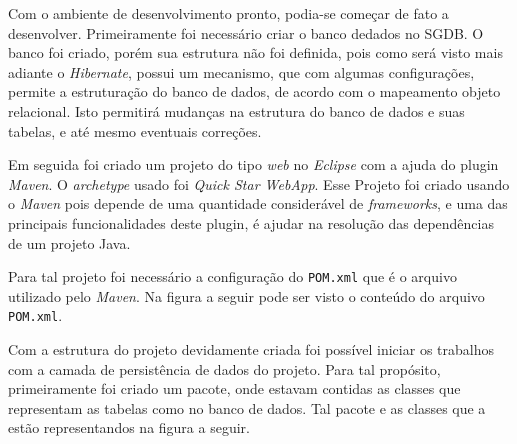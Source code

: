 
	\par Com o ambiente de desenvolvimento pronto, podia-se começar de fato a
desenvolver. Primeiramente foi necessário criar o banco dedados no SGDB. O
banco foi criado, porém sua estrutura não foi definida, pois como será
visto mais adiante o \textit{Hibernate}, possui um mecanismo, que com algumas
configurações, permite a estruturação do banco de dados, de acordo com o
mapeamento objeto relacional. Isto permitirá mudanças na estrutura do banco de
dados e suas tabelas, e até mesmo eventuais correções.

	\par Em seguida foi criado um projeto do tipo \textit{web} no \textit{Eclipse}
com a ajuda do plugin \textit{Maven}. O \textit{archetype} usado foi
\textit{Quick Star WebApp}. Esse Projeto foi criado usando o \textit{Maven}
pois depende de uma quantidade considerável de \textit{frameworks}, e uma das
principais funcionalidades deste plugin, é ajudar na resolução das dependências
de um projeto Java.

	\par Para tal projeto foi necessário a configuração do \texttt{POM.xml} que é o
arquivo utilizado pelo \textit{Maven}. Na figura a seguir pode ser visto o
conteúdo do arquivo \texttt{POM.xml}.

	\par Com a estrutura do projeto devidamente criada foi possível iniciar os
trabalhos com a camada de persistência de dados do projeto. Para tal propósito,
primeiramente foi criado um pacote, onde estavam contidas as classes que
representam as tabelas como no banco de dados. Tal pacote e as classes que a
estão representandos na figura a seguir.
